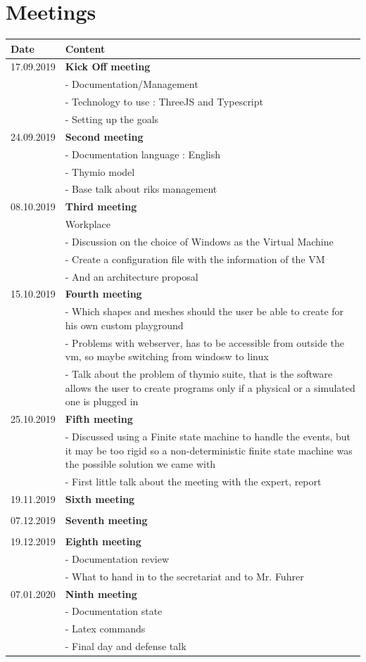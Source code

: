 \documentclass{scrbook}
\begin{document}
\chapter{Meetings}
\begin{tabular}{ | m{3cm} | m{10cm} | }
  \hline
  Date & Content \\
  \hline
  17.09.2019 & \textbf{Kick Off meeting}\\
  & - Documentation/Management\\
  & - Technology to use : ThreeJS and Typescript\\
  & - Setting up the goals\\
  \hline
  24.09.2019 & \textbf{Second meeting} \\
  & - Documentation language : English \\
  & - Thymio model \\
  & - Base talk about riks management \\
  \hline
  08.10.2019 & \textbf{Third meeting}\\
  & Workplace\\
  & - Discussion on the choice of Windows as the Virtual Machine \\
  & - Create a configuration file with the information of the VM \\
  & - And an architecture proposal \\
  \hline
  15.10.2019 & \textbf{Fourth meeting} \\
  & - Which shapes and meshes should the user be able to create for his own custom playground \\
  & - Problems with webserver, has to be accessible from outside the vm, so maybe switching from windosw to linux \\
  & - Talk about the problem of thymio suite, that is the software allows the user to create programs only if a physical or a simulated one is plugged in \\
  \hline
  25.10.2019 & \textbf{Fifth meeting} \\
  & - Discussed using a Finite state machine to handle the events, but it may be too rigid so a non-deterministic finite state machine was the possible solution we came with \\
  & - First little talk about the meeting with the expert, report\\
  \hline
  19.11.2019 & \textbf{Sixth meeting} \\
  & \\
  \hline
  07.12.2019 & \textbf{Seventh meeting} \\
  & \\
  \hline
  19.12.2019 & \textbf{Eighth meeting} \\
  & - Documentation review\\
  & - What to hand in to the secretariat and to Mr. Fuhrer\\
  \hline
  07.01.2020 & \textbf{Ninth meeting} \\
  & - Documentation state\\
  & - Latex commands\\
  & - Final day and defense talk\\
  \hline
\end{tabular}
\end{document}
